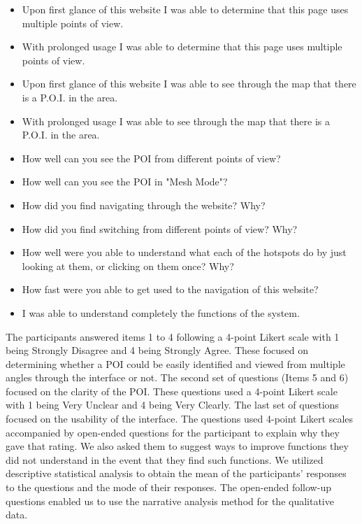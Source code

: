 \documentclass{sigchi}
\begin{document}
        \begin{itemize}
            \item Upon first glance of this website I was able to determine that this page uses multiple points of view.
            \item With prolonged usage I was able to determine that this page uses multiple points of view.
            \item Upon first glance of this website I was able to see through the map that there is a P.O.I. in the area.
            \item With prolonged usage I was able to see through the map that there is a P.O.I. in the area.
            \item How well can you see the POI from different points of view?
            \item How well can you see the POI in "Mesh Mode"?
            \item How did you find navigating through the website? Why? 
            \item How did you find switching from different points of view? Why? 
            \item How well were you able to understand what each of the hotspots do by just looking at them, or clicking on them once? Why? 
            \item How fast were you able to get used to the navigation of this website?
            \item I was able to understand completely the functions of the system. 
        \end{itemize}

The participants answered items 1 to 4 following a 4-point Likert scale with 1 being Strongly Disagree and 4 being Strongly Agree. These focused on determining whether a POI could be easily identified and viewed from multiple angles through the interface or not. The second set of questions (Items 5 and 6) focused on the clarity of the POI. These questions used a 4-point Likert scale with 1 being Very Unclear and 4 being Very Clearly. The last set of questions focused on the usability of the interface. The questions used 4-point Likert scales accompanied by open-ended questions for the participant to explain why they gave that rating. We also asked them to suggest ways to improve functions they did not understand in the event that they find such functions. We utilized descriptive statistical analysis to obtain the mean of the participants' responses to the questions and the mode of their responses. The open-ended follow-up questions enabled us to use the narrative analysis method for the qualitative data.
\end{document}
